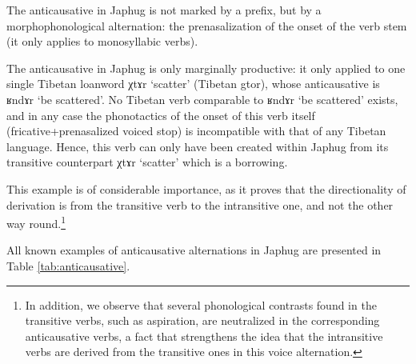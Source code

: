 \documentclass[oldfontcommands,oneside,a4paper,11pt]{article}
\newcommand{\ipa}[1]{{\phon \mbox{#1}}} %
\begin{document}
The anticausative in Japhug is not marked by a prefix, but by a morphophonological alternation: the prenasalization of the onset of the verb stem (it only applies to monosyllabic verbs).
 
The anticausative in Japhug is only marginally productive: it only applied to one single Tibetan loanword \ipa{χtɤr} `scatter' (Tibetan \ipa{gtor}), whose anticausative is \ipa{ʁndɤr} `be scattered'. No Tibetan verb comparable to \ipa{ʁndɤr} `be scattered' exists, and in any case the phonotactics of the onset of this verb itself (fricative+prenasalized voiced stop) is incompatible with that of any Tibetan language. Hence, this verb can only have been created within Japhug from its transitive counterpart \ipa{χtɤr} `scatter' which is a borrowing.

This example is of considerable importance, as it proves that the directionality of derivation is from the transitive verb to the intransitive one, and not the other way round.\footnote{In addition, we observe that several phonological contrasts found in the transitive verbs, such as aspiration, are neutralized in the corresponding anticausative verbs, a fact that strengthens the idea that the intransitive verbs are derived from the transitive ones in this voice alternation.} 

All known examples of anticausative alternations  in Japhug are presented in Table \ref{tab:anticausative}.
 
\end{document}
